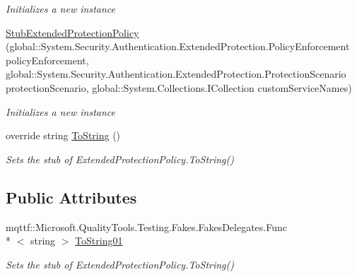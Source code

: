 \begin{DoxyCompactItemize}
\begin{DoxyCompactList}\small\item\em Initializes a new instance\end{DoxyCompactList}\item 
\hyperlink{class_system_1_1_security_1_1_authentication_1_1_extended_protection_1_1_fakes_1_1_stub_extended_protection_policy_a72a8d2943e4d64c9be82d564fc08f4b7}{Stub\-Extended\-Protection\-Policy} (global\-::\-System.\-Security.\-Authentication.\-Extended\-Protection.\-Policy\-Enforcement policy\-Enforcement, global\-::\-System.\-Security.\-Authentication.\-Extended\-Protection.\-Protection\-Scenario protection\-Scenario, global\-::\-System.\-Collections.\-I\-Collection custom\-Service\-Names)
\begin{DoxyCompactList}\small\item\em Initializes a new instance\end{DoxyCompactList}\item 
override string \hyperlink{class_system_1_1_security_1_1_authentication_1_1_extended_protection_1_1_fakes_1_1_stub_extended_protection_policy_a927bb76283436c0a36143a9d967f873a}{To\-String} ()
\begin{DoxyCompactList}\small\item\em Sets the stub of Extended\-Protection\-Policy.\-To\-String()\end{DoxyCompactList}\end{DoxyCompactItemize}
\subsection*{Public Attributes}
\begin{DoxyCompactItemize}
\item 
mqttf\-::\-Microsoft.\-Quality\-Tools.\-Testing.\-Fakes.\-Fakes\-Delegates.\-Func\\*
$<$ string $>$ \hyperlink{class_system_1_1_security_1_1_authentication_1_1_extended_protection_1_1_fakes_1_1_stub_extended_protection_policy_acd277367fb3b16c31c5c58f806d0c1f5}{To\-String01}
\begin{DoxyCompactList}\small\item\em Sets the stub of Extended\-Protection\-Policy.\-To\-String()\end{DoxyCompactList}\end{DoxyCompactItemize}
